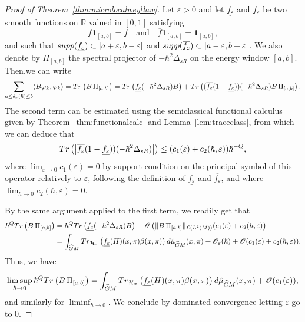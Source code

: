\documentclass[10pt,a4paper]{amsart}
\def \Ghat{\widehat{G}}
\def \O{\mathscr{O}}
\def\R{{\mathbb R}}%
\def\eps{\varepsilon}
\begin{document}
\begin{proof}[Proof of Theorem~\ref{thm:microlocalweyllaw}]
    Let $\eps>0$ and let $\underline{f_\eps}$ and $\overline{f_\eps}$ be two smooth functions on $\R$ valued in $[0,1]$ satisfying
    \begin{equation*}
        \underline{f} {\bm 1}_{[a,b]} = \underline{f}\quad \mbox{and}\quad 
        \overline{f} {\bm 1}_{[a,b]} = {\bm 1}_{[a,b]}, 
    \end{equation*}
    and such that ${\rm supp}(\underline{f_\eps})\subset [a+\eps,b-\eps]$ and ${\rm supp}(\overline{f_\eps})\subset [a-\eps,b+\eps]$.
    We also denote by $\Pi_{[a,b]}$ the spectral projector of $-\hbar^2\Delta_{sR}$ on the energy window $[a,b]$. Then,we can write
    \begin{equation*}
        \sum_{a\leq \delta_k(\hbar)\leq b}\langle B\varphi_k,\varphi_k\rangle = {\rm Tr}\left( B \,\Pi_{[a,b]}\right) = {\rm Tr}\left(\underline{f_\eps}(-\hbar^2\Delta_{sR})B\right)+ {\rm Tr}\left((\overline{f_\eps}(1-\underline{f_\eps}))(-\hbar^2\Delta_{sR}) B\,\Pi_{[a,b]}\right).
    \end{equation*}
    The second term can be estimated using the semiclassical functional calculus given by Theorem~\ref{thm:functionalcalc} and Lemma~\ref{lem:traceclass}, from which we can deduce that
    \begin{equation*}
        {\rm Tr}\left(\left|\overline{f_\eps}(1-\underline{f_\eps}))(-\hbar^2\Delta_{sR})\right|\right)\leq (c_1(\eps) + c_2(\hbar,\eps))\hbar^{-Q},
    \end{equation*}
    where $\lim_{\eps\rightarrow 0}c_1(\eps) = 0$ by support condition on the principal symbol of this operator relatively to $\eps$, following the definition of $\underline{f_\eps}$ and $\overline{f_\eps}$, and where $\lim_{\hbar\rightarrow 0}c_2(\hbar,\eps) = 0$.

    By the same argument applied to the first term, we readily get that
    \begin{equation*}
        \begin{aligned}
            \hbar^Q {\rm Tr}\left(B \,\Pi_{[a,b]}\right)
            &= \hbar^Q {\rm Tr}\left(\underline{f_\eps}(-\hbar^2\Delta_{sR})B\right) + \O\left(\|B\,\Pi_{[a,b]}\|_{\mathcal{L}(L^2(M))}(c_1(\eps)+c_2(\hbar,\eps)\right)\\
            &= \int_{\Ghat M}{\rm Tr}_{\mathcal{H}_\pi}\left(\underline{f_\eps}(H)(x,\pi)\beta(x,\pi)\right)d\hat{\mu}_{\Ghat M}(x,\pi) + \O_\eps(\hbar) + \O(c_1(\eps)+c_2(\hbar,\eps)).
        \end{aligned}
    \end{equation*}
    Thus, we have
    \begin{equation*}
        \limsup_{\hbar\rightarrow 0} \hbar^Q {\rm Tr}\left(B \,\Pi_{[a,b]}\right) = \int_{\Ghat M}{\rm Tr}_{\mathcal{H}_\pi}\left(\underline{f_\eps}(H)(x,\pi)\beta(x,\pi)\right)d\hat{\mu}_{\Ghat M}(x,\pi) + \O(c_1(\eps)),
    \end{equation*}
    and similarly for $\liminf_{\hbar\rightarrow 0}$. We conclude by dominated convergence letting $\eps$ go to 0.
\end{proof}
\end{document}
